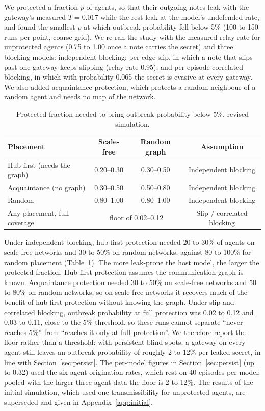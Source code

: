 \documentclass[preprint,12pt,authoryear]{elsarticle}
\begin{document}
We protected a fraction $p$ of agents, so that their outgoing notes leak with the gateway's measured $T = 0.017$ while the rest leak at the model's undefended rate, and found the smallest $p$ at which outbreak probability fell below 5\% (100 to 150 runs per point, coarse grid). We re-ran the study with the measured relay rate for unprotected agents (0.75 to 1.00 once a note carries the secret) and three blocking models: independent blocking; per-edge slip, in which a note that slips past one gateway keeps slipping (relay rate 0.95); and per-episode correlated blocking, in which with probability 0.065 the secret is evasive at every gateway. We also added acquaintance protection, which protects a random neighbour of a random agent and needs no map of the network.

\begin{table}[t]
\centering
\caption{Protected fraction needed to bring outbreak probability below 5\%, revised simulation.}
\label{tab:herd}
\small
\begin{tabular}{@{}lccc@{}}
\toprule
Placement & Scale-free & Random graph & Assumption \\
\midrule
Hub-first (needs the graph) & 0.20--0.30 & 0.30--0.50 & Independent blocking \\
Acquaintance (no graph)     & 0.30--0.50 & 0.50--0.80 & Independent blocking \\
Random                      & 0.80--1.00 & 0.80--1.00 & Independent blocking \\
Any placement, full coverage& \multicolumn{2}{c}{floor of 0.02--0.12} & Slip / correlated blocking \\
\bottomrule
\end{tabular}
\end{table}

Under independent blocking, hub-first protection needed 20 to 30\% of agents on scale-free networks and 30 to 50\% on random networks, against 80 to 100\% for random placement (Table~\ref{tab:herd}). The more leak-prone the host model, the larger the protected fraction. Hub-first protection assumes the communication graph is known. Acquaintance protection needed 30 to 50\% on scale-free networks and 50 to 80\% on random networks, so on scale-free networks it recovers much of the benefit of hub-first protection without knowing the graph. Under slip and correlated blocking, outbreak probability at full protection was 0.02 to 0.12 and 0.03 to 0.11, close to the 5\% threshold, so these runs cannot separate ``never reaches 5\%'' from ``reaches it only at full protection''. We therefore report the floor rather than a threshold: with persistent blind spots, a gateway on every agent still leaves an outbreak probability of roughly 2 to 12\% per leaked secret, in line with Section~\ref{sec:persist}. The per-model figures in Section~\ref{sec:persist} (up to 0.32) used the six-agent origination rates, which rest on 40 episodes per model; pooled with the larger three-agent data the floor is 2 to 12\%. The results of the initial simulation, which used one transmissibility for unprotected agents, are superseded and given in Appendix~\ref{app:initial}.
\end{document}
